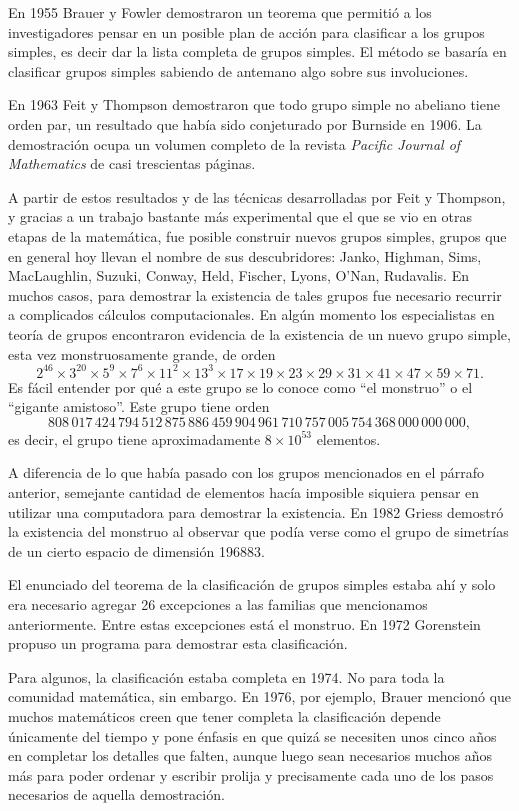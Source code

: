 En 1955 Brauer y Fowler demostraron un teorema que permitió a los investigadores
pensar en un posible plan de acción para clasificar a los grupos simples, es
decir dar la lista completa de grupos simples.  El método 
se basaría en clasificar grupos simples sabiendo de antemano algo sobre sus 
involuciones.  

En 1963 Feit y Thompson demostraron que todo grupo simple no abeliano tiene orden par, 
un resultado que había sido conjeturado por Burnside en 1906. La demostración ocupa
un volumen completo de la revista \emph{Pacific Journal of Mathematics} de casi
trescientas páginas. 

A partir de estos resultados y de las técnicas desarrolladas
por Feit y Thompson, y gracias a un trabajo bastante más experimental 
que el que se vio en otras etapas de la matemática, 
fue posible construir nuevos grupos simples, grupos que en
general hoy llevan el nombre de sus descubridores: Janko, Highman, Sims,
MacLaughlin, Suzuki, Conway, Held, Fischer, Lyons, O'Nan, Rudavalis. En muchos
casos, para demostrar la existencia de tales grupos fue necesario recurrir a
complicados cálculos computacionales. En algún momento los especialistas en
teoría de grupos encontraron evidencia de la existencia de un nuevo grupo
simple, esta vez monstruosamente grande, de orden 
\[
	2^{46}\times 3^{20}\times 5^9\times 7^6\times 11^2\times 13^3\times 17\times 19\times 23\times 29\times 31\times 41\times 47\times 59\times 71. 
\]
Es fácil entender por qué a este grupo se lo conoce como ``el monstruo'' o el 
``gigante amistoso''. Este grupo tiene orden 
\[
808\,017\,424\,794\,512\,875\,886\,459\,904\,961\,710\,757\,005\,754\,368\,000\,000\,000,
\]
es decir, el grupo tiene aproximadamente $8\times 10^{53}$ elementos.

A diferencia de lo que había pasado con los grupos mencionados en el párrafo
anterior, semejante cantidad de elementos hacía imposible siquiera pensar en
utilizar una computadora para demostrar la existencia. En 1982 Griess demostró
la existencia del monstruo al observar que podía verse como el grupo de
simetrías de un cierto espacio de dimensión 196883. 

El enunciado del teorema de la clasificación de grupos simples estaba ahí y
solo era necesario agregar 26 excepciones a las familias que mencionamos
anteriormente. Entre estas excepciones está el monstruo. En 1972 Gorenstein
propuso un programa para demostrar esta clasificación. 

Para algunos, la clasificación estaba completa en 1974. No para toda la
comunidad matemática, sin embargo. En 1976, por ejemplo, Brauer mencionó que
muchos matemáticos creen que tener completa la clasificación depende únicamente
del tiempo y pone énfasis en
que quizá se necesiten unos cinco años en completar los detalles que falten,
aunque luego sean necesarios muchos años más para poder ordenar y escribir
prolija y precisamente cada uno de los pasos necesarios de aquella demostración. 

